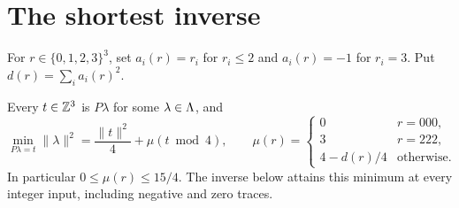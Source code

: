 \section{The shortest inverse}
For $r\in\{0,1,2,3\}^3$, set $a_i(r)=r_i$ for $r_i\le2$ and $a_i(r)=-1$ for $r_i=3$. Put $d(r)=\sum_i a_i(r)^2$.
\begin{theorem}\label{P3:thm:shortest}
Every $t\in\mathbb Z^3$ is $P\lambda$ for some $\lambda\in\Lambda$, and
\[
\boxed{\min_{P\lambda=t}\|\lambda\|^2
=\frac{\|t\|^2}{4}+\mu(t\bmod4),}
\qquad
\mu(r)=\begin{cases}
0&r=000,\\
3&r=222,\\
4-d(r)/4&\text{otherwise}.
\end{cases}
\]
In particular $0\le\mu(r)\le15/4$. The inverse below attains this minimum at every integer input, including negative and zero traces.
\end{theorem}
